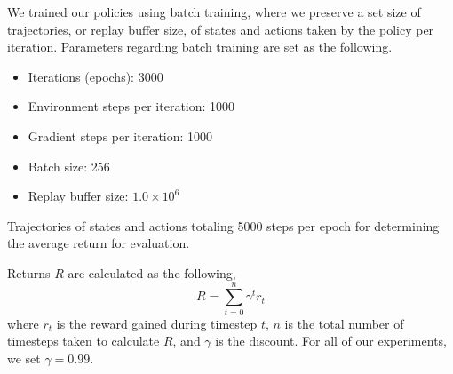 We trained our policies using batch training, where we preserve a set size of trajectories, or replay buffer size, of states and actions taken by the policy per iteration. Parameters regarding batch training are set as the following.
  \begin{itemize}
    \item Iterations (epochs): 3000
    \item Environment steps per iteration: 1000
    \item Gradient steps per iteration: 1000
    \item Batch size: 256
    \item Replay buffer size: $1.0 \times 10^6$
  \end{itemize}

Trajectories of states and actions totaling 5000 steps per epoch for determining the average return for evaluation.

Returns $R$ are calculated as the following,
  \begin{equation}
    R = \sum_{t = 0}^n \gamma^t r_t
  \end{equation}
  where $r_t$ is the reward gained during timestep $t$, $n$ is the total number of timesteps taken to calculate $R$, and $\gamma$ is the discount. For all of our experiments, we set $\gamma = 0.99$.

